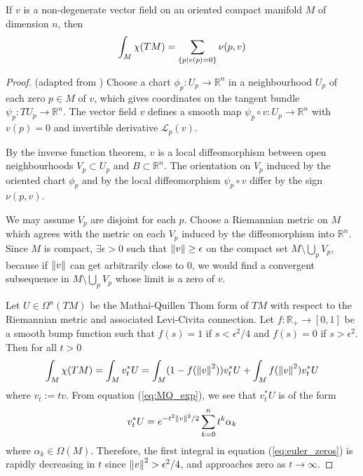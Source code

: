 \begin{thm} %
	If $v$ is a non-degenerate vector field on an oriented compact manifold $M$ 
	of dimension $n$, then 
	\[
		 \int_M \chi(TM) = \sum_{\set{p|v(p)=0}} \nu(p,v)	
	\] 
\end{thm}
\begin{proof}
	(adapted from \cite[Theorem 1.56]{bgv})
	Choose a chart $\phi_p : U_p \to \mathbb{R}^n$ in a neighbourhood $U_p$ of
	each zero $p\in M$ of $v$, which gives coordinates on the tangent bundle 
	$\psi_p : TU_p \to \mathbb{R}^n$. The vector field $v$ defines a
	smooth map $\psi_p \circ v : U_p\to \mathbb{R}^n$ 
	with $v(p) = 0$ and invertible
	derivative $\mathcal{L}_p(v)$. 

	By the inverse function theorem, $v$ is a local diffeomorphism
	between open neighbourhoods $V_p \subset U_p$ and $B \subset \mathbb{R}^n$. 
	The orientation on $V_p$ induced by the oriented chart $\phi_p$ and by 
	the local diffeomorphism $\psi_p \circ v$ differ by the sign $\nu(p,v)$. 

	We may assume  $V_p$ are disjoint for each $p$.  Choose a Riemannian metric
	on $M$ which agrees with the metric on each $V_p$ induced by the diffeomorphism
	into  $\mathbb{R}^n$. Since $M$ is compact,  $\exists \epsilon > 0$ such
	that  $\norm{v} \geq \epsilon$ on the compact set  $M\setminus \bigcup_p V_p$,
	because if $\norm{v}$ can get arbitrarily close to 0, we would find a convergent
	subsequence in $M\setminus \bigcup_p V_p$ whose limit is a zero of $v$.  

	Let $U\in \Omega^n(TM)$ be the Mathai-Quillen Thom form of  $TM$ with respect to the
	Riemannian metric and associated Levi-Civita connection. 
	Let $f : \mathbb{R}_+ \to [0,1]$ be a smooth bump function such that $f(s)=1$
	if  $s < \epsilon^2 /4$ and $f(s)=0$ if  $s>\epsilon^2$. Then for all $t>0$
	\begin{equation} \label{eq:euler_zeros}
			\int_M \chi(TM) = \int_M v_t^* U 
		= \int_M (1-f(\norm{v}^2))v_t^*U  + \int_M f(\norm{v}^2)v_t^*U
	\end{equation}
	where $v_t := tv$. From equation (\ref{eq:MQ_exp}), we see that
	$v_t^* U$ is of the form
	\[
		v_t^*U = e^{-t^2\norm{v}^2 /2} \sum_{k=0}^{n} t^k \alpha_k
	\] 
	where $\alpha_k \in \Omega(M)$. Therefore, the first integral in equation
	(\ref{eq:euler_zeros}) is rapidly decreasing in $t$ since $\norm{v}^2 >
	\epsilon^2 /4$, and approaches zero as $t\to\infty$.


\end{proof}
